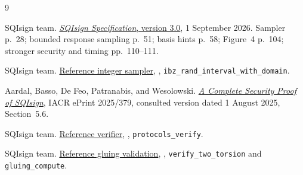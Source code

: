 \documentclass[a4paper,11pt]{article}
\newcommand{\code}[1]{\texttt{#1}}
\begin{document}
\begin{thebibliography}{9}
\small\raggedright
{}
SQIsign team.
\href{https://sqisign.org/spec/sqisign-20260901.pdf}{\emph{SQIsign Specification},
version 3.0}, 1 September 2026. Sampler p.~28; bounded response sampling
p.~51; basis hints p.~58; Figure~4 p.~104; stronger security and timing
pp.~110--111.

SQIsign team.
\href{https://github.com/SQISign/the-sqisign/blob/6d017708db403bf83977fa70770fc4f7f9e9ff21/src/mp/ref/lvlx/mp.c\#L1711}{Reference integer sampler},
,
\code{ibz\_rand\_interval\_with\_domain}.

Aardal, Basso, De Feo, Patranabis, and Wesolowski.
\href{https://eprint.iacr.org/2025/379}{\emph{A Complete Security Proof of SQIsign}},
IACR ePrint 2025/379, consulted version dated 1 August 2025, Section~5.6.

SQIsign team.
\href{https://github.com/SQISign/the-sqisign/blob/6d017708db403bf83977fa70770fc4f7f9e9ff21/src/verification/ref/lvlx/verify.c}{Reference verifier},
, \code{protocols\_verify}.

SQIsign team.
\href{https://github.com/SQISign/the-sqisign/blob/6d017708db403bf83977fa70770fc4f7f9e9ff21/src/hd/ref/lvlx/gluing.c}{Reference gluing validation},
, \code{verify\_two\_torsion} and
\code{gluing\_compute}.
\end{thebibliography}
\end{document}

